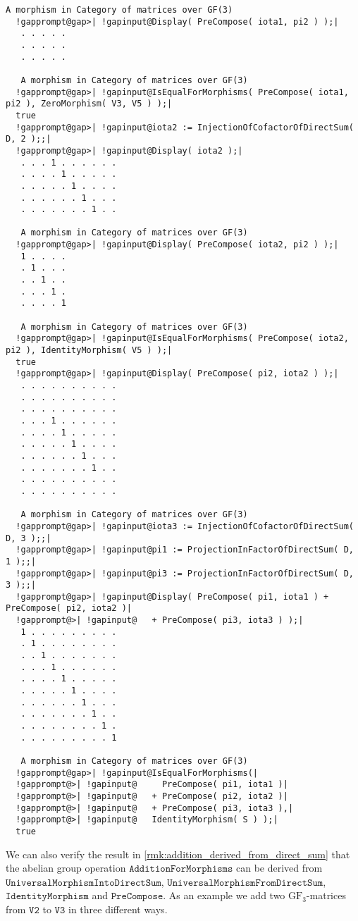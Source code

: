 \begin{computation}
\begin{Verbatim}[commandchars=!@|,fontsize=\small,frame=single,label=Example]
   A morphism in Category of matrices over GF(3)
  !gapprompt@gap>| !gapinput@Display( PreCompose( iota1, pi2 ) );|
   . . . . .
   . . . . .
   . . . . .
   
   A morphism in Category of matrices over GF(3)
  !gapprompt@gap>| !gapinput@IsEqualForMorphisms( PreCompose( iota1, pi2 ), ZeroMorphism( V3, V5 ) );|
  true
  !gapprompt@gap>| !gapinput@iota2 := InjectionOfCofactorOfDirectSum( D, 2 );;|
  !gapprompt@gap>| !gapinput@Display( iota2 );|
   . . . 1 . . . . . .
   . . . . 1 . . . . .
   . . . . . 1 . . . .
   . . . . . . 1 . . .
   . . . . . . . 1 . .
   
   A morphism in Category of matrices over GF(3)
  !gapprompt@gap>| !gapinput@Display( PreCompose( iota2, pi2 ) );|
   1 . . . .
   . 1 . . .
   . . 1 . .
   . . . 1 .
   . . . . 1
   
   A morphism in Category of matrices over GF(3)
  !gapprompt@gap>| !gapinput@IsEqualForMorphisms( PreCompose( iota2, pi2 ), IdentityMorphism( V5 ) );|
  true
  !gapprompt@gap>| !gapinput@Display( PreCompose( pi2, iota2 ) );|
   . . . . . . . . . .
   . . . . . . . . . .
   . . . . . . . . . .
   . . . 1 . . . . . .
   . . . . 1 . . . . .
   . . . . . 1 . . . .
   . . . . . . 1 . . .
   . . . . . . . 1 . .
   . . . . . . . . . .
   . . . . . . . . . .
   
   A morphism in Category of matrices over GF(3)
  !gapprompt@gap>| !gapinput@iota3 := InjectionOfCofactorOfDirectSum( D, 3 );;|
  !gapprompt@gap>| !gapinput@pi1 := ProjectionInFactorOfDirectSum( D, 1 );;|
  !gapprompt@gap>| !gapinput@pi3 := ProjectionInFactorOfDirectSum( D, 3 );;|
  !gapprompt@gap>| !gapinput@Display( PreCompose( pi1, iota1 ) + PreCompose( pi2, iota2 )|
  !gapprompt@>| !gapinput@   + PreCompose( pi3, iota3 ) );|
   1 . . . . . . . . .
   . 1 . . . . . . . .
   . . 1 . . . . . . .
   . . . 1 . . . . . .
   . . . . 1 . . . . .
   . . . . . 1 . . . .
   . . . . . . 1 . . .
   . . . . . . . 1 . .
   . . . . . . . . 1 .
   . . . . . . . . . 1
   
   A morphism in Category of matrices over GF(3)
  !gapprompt@gap>| !gapinput@IsEqualForMorphisms(|
  !gapprompt@>| !gapinput@     PreCompose( pi1, iota1 )|
  !gapprompt@>| !gapinput@   + PreCompose( pi2, iota2 )|
  !gapprompt@>| !gapinput@   + PreCompose( pi3, iota3 ),|
  !gapprompt@>| !gapinput@   IdentityMorphism( S ) );|
  true
\end{Verbatim}

We can also verify the result in \ref{rmk:addition_derived_from_direct_sum} that the abelian group operation
$\mathtt{AdditionForMorphisms}$ can be derived from $\mathtt{UniversalMorphismIntoDirectSum}$,
$\mathtt{UniversalMorphismFromDirectSum}$,\\
$\mathtt{IdentityMorphism}$ and
$\mathtt{PreCompose}$. As an example we add two $\mathrm{GF}_{3}$-matrices from $\mathtt{V2}$ to $\mathtt{V3}$ in three
different ways.


\end{computation}
